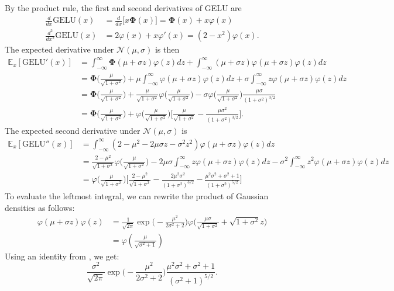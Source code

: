 \documentclass{article}
\theoremstyle{plain}
\theoremstyle{definition}
\theoremstyle{remark}
\newcommand{\Pphi}{\boldsymbol{\Phi}}
\newcommand{\E}{\mathbb{E}}
\begin{document}
By the product rule, the first and second derivatives of GELU are
\begin{align}
    \frac{d}{dx} \mathrm{GELU}(x) &= \frac{d}{dx} \Big [ x \Pphi(x) \Big ] = \Pphi(x) + x \varphi(x) \\
    \frac{d^2}{dx^2} \mathrm{GELU}(x) &= 2 \varphi(x) + x \varphi'(x) = (2 - x^2) \varphi(x).
\end{align}
The expected derivative under $\mathcal{N}(\mu, \sigma)$ is then
\begin{align*}
    \E_x [\mathrm{GELU}'(x)] &= \int_{-\infty}^{\infty} \Pphi(\mu + \sigma z) \varphi(z) dz + \int_{-\infty}^{\infty} (\mu + \sigma z) \varphi(\mu + \sigma z) \varphi(z) dz \\
    &= \Pphi \Big ( \frac{\mu}{\sqrt{1 + \sigma^2}} \Big ) + \mu \int_{-\infty}^{\infty} \varphi(\mu + \sigma z) \varphi(z) dz + \sigma \int_{-\infty}^{\infty} z \varphi(\mu + \sigma z) \varphi(z) dz \\
    &= \Pphi \Big ( \frac{\mu}{\sqrt{1 + \sigma^2}} \Big ) + \frac{\mu}{\sqrt{1 + \sigma^2}} \varphi \Big ( \frac{\mu}{\sqrt{1 + \sigma^2}} \Big ) - \sigma \varphi \Big ( \frac{\mu}{\sqrt{1 + \sigma^2}} \Big ) \frac{\mu \sigma}{(1 + \sigma^2)^{3/2}} \\
    &= \Pphi \Big ( \frac{\mu}{\sqrt{1 + \sigma^2}} \Big ) + \varphi \Big ( \frac{\mu}{\sqrt{1 + \sigma^2}} \Big ) \Big [ \frac{\mu}{\sqrt{1 + \sigma^2}} - \frac{\mu \sigma^2}{(1 + \sigma^2)^{3/2}} \Big ].
\end{align*}
The expected second derivative under $\mathcal{N}(\mu, \sigma)$ is
\begin{align}
    \E_x [\mathrm{GELU}''(x)] &= \int_{-\infty}^{\infty} (2 - \mu^2 - 2 \mu \sigma z  - \sigma^2 z^2) \varphi(\mu + \sigma z) \varphi(z) dz \\
    &= \frac{2 - \mu^2}{\sqrt{1 + \sigma^2}} \varphi \Big ( \frac{\mu}{\sqrt{1 + \sigma^2}} \Big ) - 2 \mu \sigma \int_{-\infty}^{\infty} z \varphi(\mu + \sigma z) \varphi(z) dz - \sigma^2 \int_{-\infty}^{\infty} z^2 \varphi(\mu + \sigma z) \varphi(z) dz \\
    &= \varphi \Big ( \frac{\mu}{\sqrt{1 + \sigma^2}} \Big ) \Big [ \frac{2 - \mu^2}{\sqrt{1 + \sigma^2}} - \frac{2 \mu^2 \sigma^2}{(1 + \sigma^2)^{3/2}} - \frac{\mu^2 \sigma^2 + \sigma^2 + 1}{(1 + \sigma^2)^{5/2}} \Big ] %
\end{align}
To evaluate the leftmost integral, we can rewrite the product of Gaussian densities as follows:
\begin{align}
    \varphi(\mu + \sigma z) \varphi(z) &= \frac{1}{\sqrt{2 \pi}} \exp \Big ( -\frac{\mu^2}{2 \sigma^2 + 2} \Big ) \varphi \Big ( \frac{\mu \sigma}{\sqrt{1 + \sigma^2}} + \sqrt{1 + \sigma^2} z \Big ) \\
    &= \varphi ( \frac{\mu}{\sqrt{\sigma^2 + 1}} )
\end{align}
Using an identity from \citet{owen1980table}, we get:
\begin{equation}
    \frac{\sigma^2}{\sqrt{2 \pi}} \exp \Big ( -\frac{\mu^2}{2 \sigma^2 + 2} \Big ) \frac{\mu^2 \sigma^2 + \sigma^2 + 1}{(\sigma^2 + 1)^{5/2}}.
\end{equation}
\end{document}
